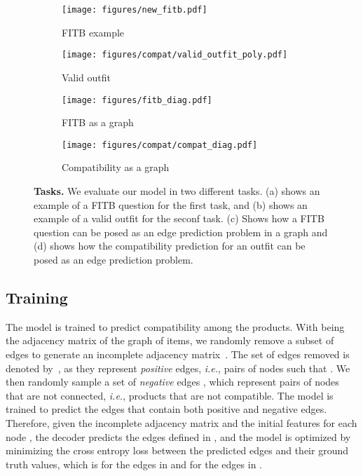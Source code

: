 \documentclass[10pt,twocolumn,letterpaper]{article}
\begin{document}
\begin{figure*}[t]
\begin{center}
\begin{subfigure}{.28\textwidth}
  \centering
  \texttt{[image: figures/new\_fitb.pdf]}
  \caption{FITB example}
  \label{fig:fitb_examplea}
\end{subfigure}\hspace{1em}
\begin{subfigure}{.23\textwidth}
  \centering
  \texttt{[image: figures/compat/valid\_outfit\_poly.pdf]}
  \caption{Valid outfit}
  \label{fig:valid_outfit}
\end{subfigure}\hspace{1em}
\begin{subfigure}{.23\textwidth}
  \centering
  \texttt{[image: figures/fitb\_diag.pdf]}
  \caption{FITB as a graph}
  \label{fig:fitb_graph}
\end{subfigure}
\begin{subfigure}{.20\linewidth}
  \centering
  \texttt{[image: figures/compat/compat\_diag.pdf]}
  \caption{Compatibility as a graph}
  \label{fig:compat_graph}
\end{subfigure}
\end{center}
\caption{\textbf{Tasks.} We evaluate our model in two different tasks. (a) shows an example of a FITB question for the first task, and (b) shows an example of a valid outfit for the seconf task. (c) Shows how a FITB question can be posed as an edge prediction problem in a graph and (d) shows how the compatibility prediction for an outfit can be posed as an edge prediction problem.}
\end{figure*}

\subsection{Training}
\label{sseq:training}
The model is trained to predict compatibility among the products. With  being the adjacency matrix of the graph of items, we randomly remove a subset of edges to generate an incomplete adjacency matrix~. The set of edges removed is denoted by~, as they represent \textit{positive} edges, \textit{i.e.}, pairs of nodes  such that . We then randomly sample a set of \textit{negative} edges , which represent pairs of nodes  that are not connected, \textit{i.e.}, products that are not compatible. The model is trained to predict the edges  that contain both positive and negative edges. Therefore, given the incomplete adjacency matrix  and the initial features for each node , the decoder predicts the edges defined in , and the model is optimized by minimizing the cross entropy loss between the predicted edges and their ground truth values, which is  for the edges in  and  for the edges in .
\end{document}
